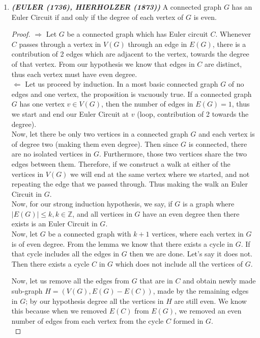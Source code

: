 \documentclass[12pt, fullpage]{article}
\newcommand{\Z}{\mathbb Z}
\begin{document}
\begin{enumerate}
	\item \textit{\textbf{(EULER (1736), HIERHOLZER (1873))}} A connected graph $G$ has an Euler Circuit if and only if the degree of each vertex of $G$ is even.
\begin{proof}
 	$\Longrightarrow$ Let $G$ be a connected graph which has Euler circuit $C$. Whenever $C$ passes through a vertex in $V(G)$ through an edge in $E(G)$, there is a contribution of 2 edges which are adjacent to the vertex, towards the degree of that vertex. From our hypothesis we know that edges in $C$ are distinct, thus each vertex must have even degree. \\
 	
 	$\Longleftarrow$ Let us proceed by induction. In a most basic connected graph $G$ of no edges and one vertex, the proposition is vacuously true. If a connected graph $G$ has one vertex $v \in V(G)$, then the number of edges in $E(G) = 1$, thus we start and end our Euler Circuit at $v$ (loop, contribution of 2 towards the degree). \\
 	
 	Now, let there be only two vertices in a connected graph $G$ and each vertex is of degree two (making them even degree). Then since $G$ is connected, there are no isolated vertices in $G$. Furthermore, those two vertices share the two edges between them. Therefore, if we construct a walk at either of the vertices in $V(G)$ we will end at the same vertex where we started, and not repeating the edge that we passed through. Thus making the walk an Euler Circuit in $G$.\\ 
 	
 	Now, for our strong induction hypothesis, we say, if $G$ is a graph where $\vert E(G)\vert \leq k, k \in \Z$, and all vertices in $G$ have an even degree then there exists	 is an Euler Circuit in $G$.\\
 	
 	 Now, let $G$ be a connected graph with $k+1$ vertices, where each vertex in $G$ is of even degree. From the lemma we know that there exists a cycle in $G$. If that cycle includes all the edges in $G$ then we are done. Let's say it does not. Then there exists a cycle $C$ in $G$ which does not include all the vertices of $G$. 
 	 
 	 Now, let us remove all the edges from $G$ that are in $C$ and obtain newly made sub-graph $H = (V(G), E(G)-E(C))$, made by the remaining edges in $G$; by our hypothesis degree all the vertices in $H$ are still even. We know this because when we removed $E(C)$ from $E(G)$, we removed an even number of edges from each vertex from the cycle $C$ formed in $G$.\\
 	 

\end{proof}
\end{enumerate}
\end{document}
